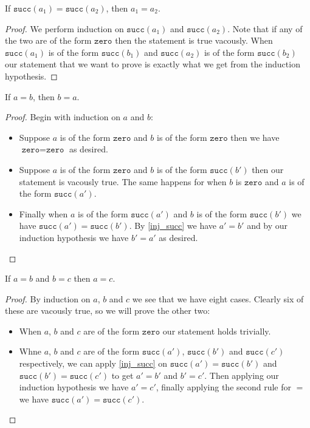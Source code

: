 \begin{lemma}\label{inj_succ}
    If $\texttt{succ}(a_1) = \texttt{succ}(a_2)$, then $a_1 = a_2$.
\end{lemma}

\begin{proof}
    We perform induction on $\texttt{succ}(a_1)$ and $\texttt{succ}(a_2)$. Note that if any of the two are of the form $\texttt{zero}$ then the statement is true vacously. When $\texttt{succ}(a_1)$ is of the form $\texttt{succ}(b_1)$ and $\texttt{succ}(a_2)$ is of the form $\texttt{succ}(b_2)$ our statement that we want to prove is exactly what we get from the induction hypothesis.
\end{proof}


\begin{lemma}[Symmetry of $=$]
    If $a = b$, then $b = a$.
\end{lemma}

\begin{proof}
    Begin with induction on $a$ and $b$:
    \begin{itemize}
        \item Suppose $a$ is of the form $\texttt{zero}$ and $b$ is of the form $\texttt{zero}$ then we have $\texttt{zero} = \texttt{zero}$ as desired.
        \item Suppose $a$ is of the form $\texttt{zero}$ and $b$ is of the form $\texttt{succ}(b')$ then our statement is vacously true. The same happens for when $b$ is $\texttt{zero}$ and $a$ is of the form $\texttt{succ}(a')$.
        \item Finally when $a$ is of the form $\texttt{succ}(a')$ and $b$ is of the form $\texttt{succ}(b')$ we have $\texttt{succ}(a')= \texttt{succ}(b')$. By \ref{inj_succ} we have $a'=b'$ and by our induction hypothesis we have $b' = a'$ as desired.
    \end{itemize}
\end{proof}


\begin{lemma}[Transitivity of $=$]
    If $a = b$ and $b = c$ then $a = c$.
\end{lemma}

\begin{proof}
    By induction on $a$, $b$ and $c$ we see that we have eight cases. Clearly six of these are vacously true, so we will prove the other two:
    \begin{itemize}
        \item When $a$, $b$ and $c$ are of the form $\texttt{zero}$ our statement holds trivially.
        \item Whne $a$, $b$ and $c$ are of the form $\texttt{succ}(a')$, $\texttt{succ}(b')$ and $\texttt{succ}(c')$ respectively, we can apply \ref{inj_succ} on $\texttt{succ}(a') =\texttt{succ}(b')$ and $\texttt{succ}(b') = \texttt{succ}(c')$ to get $a' = b'$ and $b' = c'$. Then applying our induction hypothesis we have $a' = c'$, finally applying the second rule for $=$ we have $\texttt{succ}(a') =\texttt{succ}(c')$.
    \end{itemize}
\end{proof}

